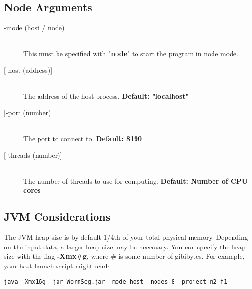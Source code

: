 \documentclass[]{article}
\begin{document}
\subsection{Node Arguments}
\begin{description}
	\item[-mode (host / node)] \hfill \\
	This must be specified with "\textbf{node}" to start the program in node mode.
	\item[{[-host (address)]}] \hfill \\
	The address of the host process. \textbf{Default: "localhost"}
	\item[{[-port (number)]}] \hfill \\
	The port to connect to. \textbf{Default: 8190}
	\item[{[-threads (number)]}] \hfill \\
	The number of threads to use for computing. \textbf{Default: Number of CPU cores}
\end{description}

\subsection{JVM Considerations}
The JVM heap size is by default 1/4th of your total physical memory. Depending on the input data, a larger heap size may be necessary. You can specify the heap size with the flag \textbf{-Xmx\#g}, where \# is some number of gibibytes. For example, your host launch script might read:
\begin{lstlisting}
java -Xmx16g -jar WormSeg.jar -mode host -nodes 8 -project n2_f1
\end{lstlisting}
\end{document}
